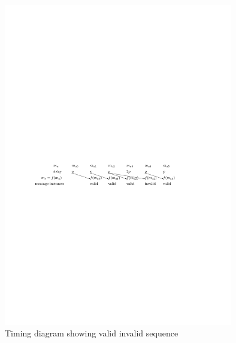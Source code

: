 \begin{figure}
\begin{center}
\includegraphics[width = 100mm]{timing_diagram_delay_cosntraint.pdf}
\end{center}
\caption{Timing diagram showing valid invalid sequence}
\label{tim_dig_delay}
\end{figure}

